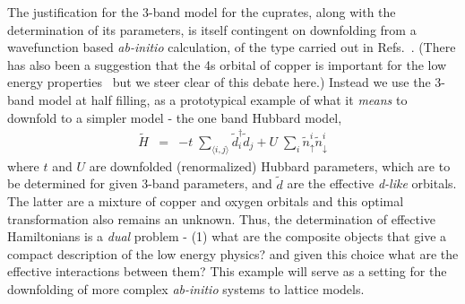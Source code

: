 \documentclass[prl,12pt,onecolumn,nofootinbib,notitlepage,english,superscriptaddress]{revtex4-1}
\begin{document}
The justification for the 3-band model for the cuprates, along with the determination of its parameters, 
is itself contingent on downfolding from a wavefunction based \emph{ab-initio} calculation, 
of the type carried out in Refs.~\cite{Wagner_Abbamonte}. (There has also been a suggestion that the 4s orbital of copper is important 
for the low energy properties~\cite{Pavirini} but we steer clear of this debate here.) 
Instead we use the 3-band model at half filling, as a prototypical example of what it \emph{means} to downfold to 
a simpler model - the one band Hubbard model, 
\begin{eqnarray}
	\tilde{H} &=&  -t \;\sum_{\langle i,j \rangle} \tilde{d}_i^{\dagger} \tilde{d}_j + U \;\sum_{i} \tilde{n}^{i}_{\uparrow} \tilde{n}^{i}_{\downarrow}
\label{eq:oneband}
\end{eqnarray}
where $t$ and $U$ are downfolded (renormalized) Hubbard parameters, which are to 
be determined for given 3-band parameters, and $\tilde{d}$ are the effective \emph{d-like} orbitals. 
The latter are a mixture of copper and oxygen orbitals and this optimal transformation also remains an unknown. Thus, 
the determination of effective Hamiltonians is a \emph{dual} problem - (1) what are the composite objects that give a 
compact description of the low energy physics? and given this choice what are the effective interactions between them?  
This example will serve as a setting for the downfolding of more complex \emph{ab-initio} systems to lattice 
models. 
\end{document}
